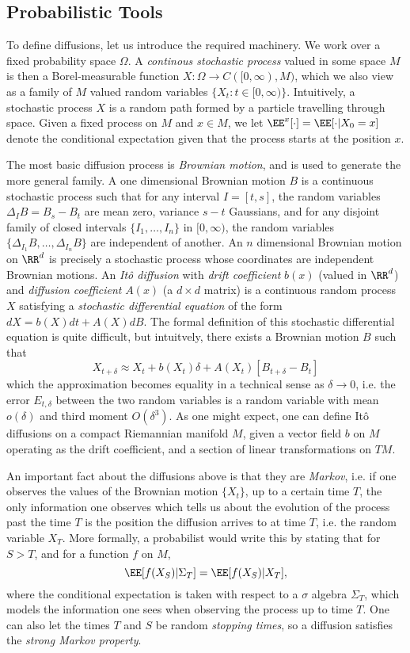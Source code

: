 \subsection{Probabilistic Tools}

To define diffusions, let us introduce the required machinery. We work over a fixed probability space $\Omega$. A \emph{continous stochastic process} valued in some space $M$ is then a Borel-measurable function $X: \Omega \to C([0,\infty),M)$, which we also view as a family of $M$ valued random variables $\{ X_t: t \in [0,\infty) \}$. Intuitively, a stochastic process $X$ is a random path formed by a particle travelling through space. Given a fixed process on $M$ and $x \in M$, we let $\EE^x[\cdot] = \EE[ \cdot | X_0 = x ]$ denote the conditional expectation given that the process starts at the position $x$.

The most basic diffusion process is \emph{Brownian motion}, and is used to generate the more general family. A one dimensional Brownian motion $B$ is a continuous stochastic process such that for any interval $I = [t,s]$, the random variables $\Delta_I B = B_s - B_t$ are mean zero, variance $s - t$ Gaussians, and for any disjoint family of closed intervals $\{ I_1,\dots, I_n \}$ in $[0,\infty)$, the random variables $\{ \Delta_{I_1} B, \dots, \Delta_{I_n} B \}$ are independent of another. An $n$ dimensional Brownian motion on $\RR^d$ is precisely a stochastic process whose coordinates are independent Brownian motions. An \emph{It\^{o} diffusion} with \emph{drift coefficient} $b(x)$ (valued in $\RR^d$) and \emph{diffusion coefficient} $A(x)$ (a $d \times d$ matrix) is a continuous random process $X$ satisfying a \emph{stochastic differential equation} of the form $dX = b(X) dt + A(X) dB$. The formal definition of this stochastic differential equation is quite difficult, but intuitvely, there exists a Brownian motion $B$ such that
%
\[ X_{t + \delta} \approx X_t + b(X_t) \delta + A(X_t) [B_{t + \delta} - B_t] \]
%
which the approximation becomes equality in a technical sense as $\delta \to 0$, i.e. the error $E_{t,\delta}$ between the two random variables is a random variable with mean $o(\delta)$ and third moment $O(\delta^3)$. As one might expect, one can define It\^{o} diffusions on a compact Riemannian manifold $M$, given a vector field $b$ on $M$ operating as the drift coefficient, and a section of linear transformations on $TM$.

An important fact about the diffusions above is that they are \emph{Markov}, i.e. if one observes the values of the Brownian motion $\{ X_t \}$, up to a certain time $T$, the only information one observes which tells us about the evolution of the process past the time $T$ is the position the diffusion arrives to at time $T$, i.e. the random variable $X_T$. More formally, a probabilist would write this by stating that for $S > T$, and for a function $f$ on $M$,
%
\[ \EE[ f(X_S) | \Sigma_T ] = \EE[ f(X_S) | X_T ], \]
%
where the conditional expectation is taken with respect to a $\sigma$ algebra $\Sigma_T$, which models the information one sees when observing the process up to time $T$. One can also let the times $T$ and $S$ be random \emph{stopping times}, so a diffusion satisfies the \emph{strong Markov property}.

